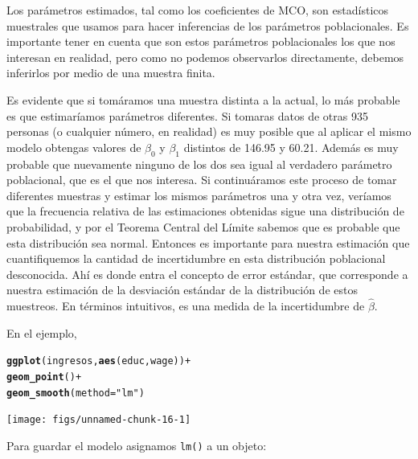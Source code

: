 \documentclass{article}\usepackage[]{graphicx}\usepackage[]{color}
\makeatletter
\newcommand{\hlstr}[1]{\textcolor[rgb]{0.192,0.494,0.8}{#1}}%
\newcommand{\hlopt}[1]{\textcolor[rgb]{0,0,0}{#1}}%
\newcommand{\hlstd}[1]{\textcolor[rgb]{0.345,0.345,0.345}{#1}}%
\newcommand{\hlkwc}[1]{\textcolor[rgb]{0.333,0.667,0.333}{#1}}%
\newcommand{\hlkwd}[1]{\textcolor[rgb]{0.737,0.353,0.396}{\textbf{#1}}}%
\newenvironment{kframe}{%
 \def\at@end@of@kframe{}%
 \ifinner\ifhmode%
  \def\at@end@of@kframe{\end{minipage}}%
  \begin{minipage}{\columnwidth}%
 \fi\fi%
 \def\FrameCommand##1{\hskip\@totalleftmargin \hskip-\fboxsep
 \colorbox{shadecolor}{##1}\hskip-\fboxsep
     \hskip-\linewidth \hskip-\@totalleftmargin \hskip\columnwidth}%
 \MakeFramed {\advance\hsize-\width
   \@totalleftmargin\z@ \linewidth\hsize
   \@setminipage}}%
 {\par\unskip\endMakeFramed%
 \at@end@of@kframe}
\newenvironment{knitrout}{}{} %
\makeatother
\begin{document}
Los parámetros estimados, tal como los coeficientes de MCO, son estadísticos muestrales que usamos para hacer inferencias de los parámetros poblacionales. Es importante tener en cuenta que son estos parámetros poblacionales los que nos interesan en realidad, pero como no podemos observarlos directamente, debemos inferirlos por medio de una muestra finita.

Es evidente que si tomáramos una muestra distinta a la actual, lo más probable es que estimaríamos parámetros diferentes. Si tomaras datos de otras 935 personas (o cualquier número, en realidad) es muy posible que al aplicar el mismo modelo obtengas valores de $\beta_0$ y $\beta_1$ distintos de 146.95 y 60.21. Además es muy probable que nuevamente ninguno de los dos sea igual al verdadero parámetro poblacional, que es el que nos interesa. Si continuáramos este proceso de tomar diferentes muestras y estimar los mismos parámetros una y otra vez, veríamos que la frecuencia relativa de las estimaciones obtenidas sigue una distribución de probabilidad, y por el Teorema Central del Límite sabemos que es probable que esta distribución sea normal. Entonces es importante para nuestra estimación que cuantifiquemos la cantidad de incertidumbre en esta distribución poblacional desconocida. Ahí es donde entra el concepto de error estándar, que corresponde a nuestra estimación de la desviación estándar de la distribución de estos muestreos. En términos intuitivos, es una medida de la incertidumbre de $\hat\beta$.

En el ejemplo, 

\begin{knitrout}
\color{fgcolor}\begin{kframe}
\begin{alltt}
\hlkwd{ggplot}\hlstd{(ingresos,} \hlkwd{aes}\hlstd{(educ, wage))} \hlopt{+}
  \hlkwd{geom_point}\hlstd{()} \hlopt{+}
  \hlkwd{geom_smooth}\hlstd{(}\hlkwc{method} \hlstd{=} \hlstr{"lm"}\hlstd{)}
\end{alltt}
\end{kframe}

{\centering \texttt{[image: figs/unnamed-chunk-16-1]} 

}



\end{knitrout}


Para guardar el modelo asignamos \verb|lm()| a un objeto:
\end{document}

